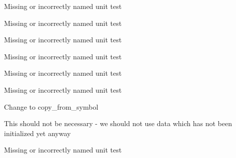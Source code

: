 \begin{DoxyRefList}
\item[\label{todo__todo000026}%
\hypertarget{todo__todo000026}{}%
Class \hyperlink{classkodo_1_1carousel__encoder}{kodo\-:\-:carousel\-\_\-encoder$<$ Super\-Coder $>$} ]Missing or incorrectly named unit test


\item[\label{todo__todo000004}%
\hypertarget{todo__todo000004}{}%
Class \hyperlink{classkodo_1_1coefficient__storage}{kodo\-:\-:coefficient\-\_\-storage$<$ Super\-Coder $>$} ]Missing or incorrectly named unit test


\item[\label{todo__todo000005}%
\hypertarget{todo__todo000005}{}%
Class \hyperlink{classkodo_1_1debug__cached__symbol__decoder}{kodo\-:\-:debug\-\_\-cached\-\_\-symbol\-\_\-decoder$<$ Super\-Coder $>$} ]Missing or incorrectly named unit test


\item[\label{todo__todo000006}%
\hypertarget{todo__todo000006}{}%
Class \hyperlink{classkodo_1_1debug__symbol__storage}{kodo\-:\-:debug\-\_\-symbol\-\_\-storage$<$ Super\-Coder $>$} ]Missing or incorrectly named unit test


\item[\label{todo__todo000007}%
\hypertarget{todo__todo000007}{}%
Class \hyperlink{classkodo_1_1deep__storage__decoder}{kodo\-:\-:deep\-\_\-storage\-\_\-decoder$<$ Decoder\-Type, Block\-Partitioning $>$} ]Missing or incorrectly named unit test  
\item[\label{todo__todo000008}%
\hypertarget{todo__todo000008}{}%
Class \hyperlink{classkodo_1_1deep__symbol__storage}{kodo\-:\-:deep\-\_\-symbol\-\_\-storage$<$ Super\-Coder $>$} ]Missing or incorrectly named unit test


\item[\label{todo__todo000010}%
\hypertarget{todo__todo000010}{}%
Member \hyperlink{classkodo_1_1deep__symbol__storage_a4179c6d0816eeec26f71f36fe065fd70}{kodo\-:\-:deep\-\_\-symbol\-\_\-storage$<$ Super\-Coder $>$\-:\-:copy\-\_\-symbol} (uint32\-\_\-t index, const sak\-::mutable\-\_\-storage \&dest) const ]Change to copy\-\_\-from\-\_\-symbol  
\item[\label{todo__todo000009}%
\hypertarget{todo__todo000009}{}%
Member \hyperlink{classkodo_1_1deep__symbol__storage_a9621739e5efd28d5c3dce6cdc588e892}{kodo\-:\-:deep\-\_\-symbol\-\_\-storage$<$ Super\-Coder $>$\-:\-:initialize} (Factory \&the\-\_\-factory)]This should not be necessary -\/ we should not use data which has not been initialized yet anyway  
\item[\label{todo__todo000011}%
\hypertarget{todo__todo000011}{}%
Class \hyperlink{classkodo_1_1empty__decoder}{kodo\-:\-:empty\-\_\-decoder$<$ Super\-Coder $>$} ]Missing or incorrectly named unit test



\end{DoxyRefList}
